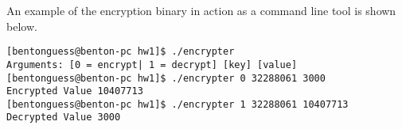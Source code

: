 \documentclass[11pt]{article}
\begin{document}
An example of the encryption binary in action as a command line tool is shown below.

\begin{lstlisting}
[bentonguess@benton-pc hw1]$ ./encrypter 
Arguments: [0 = encrypt| 1 = decrypt] [key] [value]
[bentonguess@benton-pc hw1]$ ./encrypter 0 32288061 3000
Encrypted Value 10407713
[bentonguess@benton-pc hw1]$ ./encrypter 1 32288061 10407713
Decrypted Value 3000
\end{lstlisting}
\end{document}

